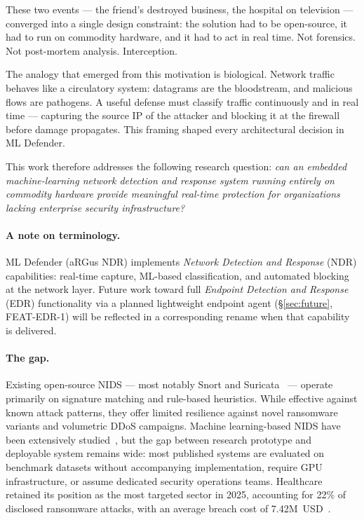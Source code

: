 \documentclass[11pt,a4paper]{article}
\begin{document}
These two events --- the friend's destroyed business, the hospital on television ---
converged into a single design constraint: the solution had to be open-source, it had to run
on commodity hardware, and it had to act in real time. Not forensics. Not post-mortem
analysis. Interception.

The analogy that emerged from this motivation is biological. Network traffic behaves like a
circulatory system: datagrams are the bloodstream, and malicious flows are pathogens. A
useful defense must classify traffic continuously and in real time --- capturing the source IP
of the attacker and blocking it at the firewall before damage propagates. This framing shaped
every architectural decision in ML Defender.

This work therefore addresses the following research question: \emph{can an embedded
machine-learning network detection and response system running entirely on commodity hardware
provide meaningful real-time protection for organizations lacking enterprise security
infrastructure?}

\paragraph{A note on terminology.}
ML Defender (aRGus NDR) implements \emph{Network Detection and Response} (NDR) capabilities:
real-time capture, ML-based classification, and automated blocking at the network layer.
Future work toward full \emph{Endpoint Detection and Response} (EDR) functionality via a
planned lightweight endpoint agent (\S\ref{sec:future}, FEAT-EDR-1) will be reflected in a
corresponding rename when that capability is delivered.

\paragraph{The gap.}
Existing open-source NIDS --- most notably Snort and Suricata~\cite{oisf2010} --- operate
primarily on signature matching and rule-based heuristics. While effective against known
attack patterns, they offer limited resilience against novel ransomware variants and volumetric
DDoS campaigns. Machine learning-based NIDS have been extensively studied~\cite{buczak2016,
pinto2023}, but the gap between research prototype and deployable system remains wide: most
published systems are evaluated on benchmark datasets without accompanying implementation,
require GPU infrastructure, or assume dedicated security operations teams. Healthcare retained
its position as the most targeted sector in 2025, accounting for 22\% of disclosed ransomware
attacks, with an average breach cost of 7.42M~USD~\cite{blackfog2025,ibmsecurity2025}.
\end{document}
